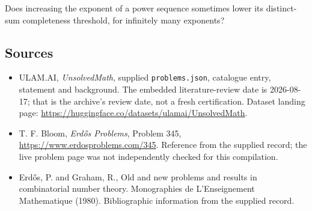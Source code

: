 \documentclass[11pt,a4paper]{article}
\begin{document}
Does increasing the exponent of a power sequence sometimes lower its distinct-sum completeness threshold, for infinitely many exponents?

\subsection{Sources}

{\small

\begin{itemize}

\item[\hypertarget{source:statement:1}{S1}] ULAM.AI, \emph{UnsolvedMath}, supplied \texttt{problems.json}, catalogue entry, statement and background. The embedded literature-review date is 2026-08-17; that is the archive’s review date, not a fresh certification. Dataset landing page: \url{https://huggingface.co/datasets/ulamai/UnsolvedMath}.

\item[\hypertarget{source:statement:2}{S2}] T. F. Bloom, \emph{Erdős Problems}, Problem 345, \url{https://www.erdosproblems.com/345}. Reference from the supplied record; the live problem page was not independently checked for this compilation.

\item[\hypertarget{source:statement:3}{S3}] Erd\H{o}s, P. and Graham, R., Old and new problems and results in combinatorial number theory. Monographies de L'Enseignement Mathematique (1980). Bibliographic information from the supplied record.

\end{itemize}

}

\label{end:statement}
\end{document}
